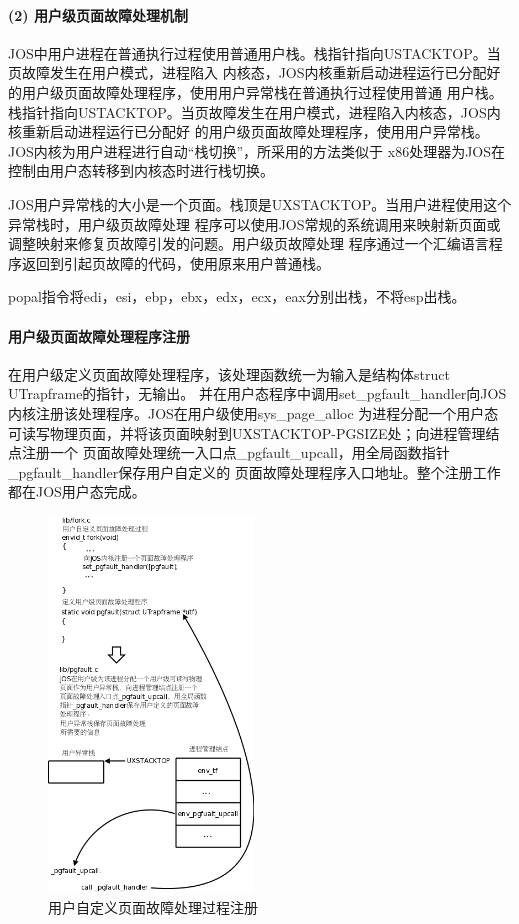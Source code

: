 \documentclass[12pt,openany,a4paper]{report}
\begin{document}
	\paragraph{(2) 用户级页面故障处理机制}
	    JOS中用户进程在普通执行过程使用普通用户栈。栈指针指向USTACKTOP。当页故障发生在用户模式，进程陷入
	内核态，JOS内核重新启动进程运行已分配好的用户级页面故障处理程序，使用用户异常栈在普通执行过程使用普通
	用户栈。栈指针指向USTACKTOP。当页故障发生在用户模式，进程陷入内核态，JOS内核重新启动进程运行已分配好
	的用户级页面故障处理程序，使用用户异常栈。JOS内核为用户进程进行自动“栈切换”，所采用的方法类似于
	x86处理器为JOS在控制由用户态转移到内核态时进行栈切换。\par
	    JOS用户异常栈的大小是一个页面。栈顶是UXSTACKTOP。当用户进程使用这个异常栈时，用户级页故障处理
	程序可以使用JOS常规的系统调用来映射新页面或调整映射来修复页故障引发的问题。用户级页故障处理
	程序通过一个汇编语言程序返回到引起页故障的代码，使用原来用户普通栈。\par
	    popal指令将edi，esi，ebp，ebx，edx，ecx，eax分别出栈，不将esp出栈。\par
	\paragraph{用户级页面故障处理程序注册}
	    在用户级定义页面故障处理程序，该处理函数统一为输入是结构体struct UTrapframe的指针，无输出。
	并在用户态程序中调用set\_pgfault\_handler向JOS内核注册该处理程序。JOS在用户级使用sys\_page\_alloc
	为进程分配一个用户态可读写物理页面，并将该页面映射到UXSTACKTOP-PGSIZE处；向进程管理结点注册一个
	页面故障处理统一入口点\_pgfault\_upcall，用全局函数指针\_pgfault\_handler保存用户自定义的
	页面故障处理程序入口地址。整个注册工作都在JOS用户态完成。\par
	\begin{figure}[htb]
		\centering
		\includegraphics[height=10cm]{pgfault.png}
		\caption[用户自定义页面故障处理过程注册]{用户自定义页面故障处理过程注册}
	\end{figure}
\end{document}

